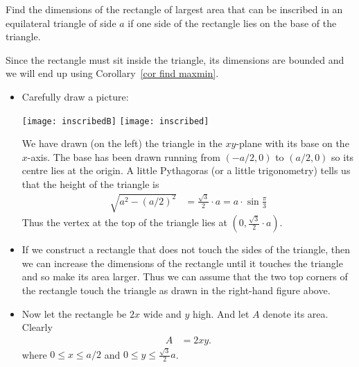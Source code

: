 \begin{eg}\label{APPglobalMaxMinE}
Find the dimensions of the rectangle of largest area that can be inscribed in an
equilateral triangle of side $a$ if one side of the rectangle lies on the base
of the triangle.

\soln Since the rectangle must sit inside the triangle, its dimensions are
bounded and we will end up using Corollary~\ref{cor find maxmin}.
\begin{itemize}
 \item Carefully draw a picture:
\begin{efig}
\begin{center}
   \texttt{[image: inscribedB]}
  \quad
   \texttt{[image: inscribed]}
\end{center}
\end{efig}
We have drawn (on the left) the triangle in the $xy$-plane with its base on the
$x$-axis. The base has been drawn running from $(-a/2,0)$ to $(a/2,0)$ so
its centre lies at the origin. A little Pythagoras (or a little trigonometry)
tells us that the height of the triangle is
\begin{align*}
  \sqrt{a^2-(a/2)^2} &= \frac{\sqrt{3}}{2}\cdot a = a\cdot \sin\frac{\pi}{3}
\end{align*}
Thus the vertex at the top of the triangle lies at
$\left(0,\frac{\sqrt{3}}{2}\cdot a\right)$.

\item If we construct a rectangle that does not touch the sides of the
triangle, then we can increase the dimensions of the rectangle until it touches
the triangle and so make its area larger. Thus we can assume that the
two top corners of the rectangle touch the triangle as drawn in the
right-hand figure above.

\item Now let the rectangle be $2x$ wide and $y$ high. And let $A$ denote its
area. Clearly
\begin{align*}
  A &= 2xy.
\end{align*}
where $0 \leq x \leq a/2$ and $0\leq y\leq \frac{\sqrt{3}}{2}a$.



\end{itemize}
\end{eg}
